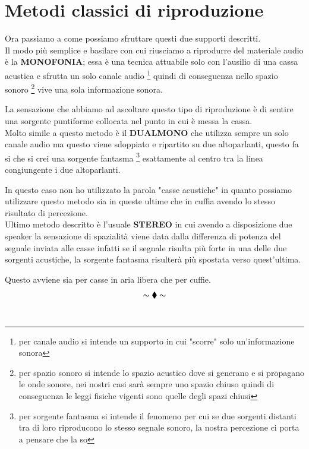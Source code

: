 \documentclass[12pt,a4paper]{report}
\begin{document}
\section{Metodi classici di riproduzione}\label{metodi}

Ora passiamo a come possiamo sfruttare questi due supporti descritti.\\

Il modo più semplice e basilare con cui riusciamo a riprodurre del materiale audio è la \textbf{MONOFONIA}; essa è una tecnica attuabile solo con l'ausilio di una cassa acustica e sfrutta un solo canale audio \footnote{per canale audio si intende un supporto in cui "scorre" solo un'informazione sonora}
quindi di conseguenza nello spazio sonoro \footnote{per spazio sonoro si intende lo spazio acustico dove si generano e si propagano le onde sonore, nei nostri casi sarà sempre uno spazio chiuso quindi di conseguenza le leggi fisiche vigenti sono quelle degli spazi chiusi} vive una sola informazione sonora.

La sensazione che abbiamo ad ascoltare questo tipo di riproduzione è di sentire una sorgente puntiforme collocata nel punto in cui è messa la cassa.\\

Molto simile a questo metodo è il \textbf{DUALMONO} che utilizza sempre un solo canale audio ma questo viene sdoppiato e ripartito su due altoparlanti, questo fa si che si crei una sorgente fantasma \footnote{per sorgente fantasma si intende il fenomeno per cui se due sorgenti distanti tra di loro riproducono lo stesso segnale sonoro, la nostra percezione ci porta a pensare che la so} esattamente al centro tra la linea congiungente i due altoparlanti. 

In questo caso non ho utilizzato la parola "casse acustiche" in quanto possiamo utilizzare questo metodo sia in queste ultime che in cuffia avendo lo stesso risultato di percezione.\\

Ultimo metodo descritto è l'usuale \textbf{STEREO} in cui avendo a disposizione due speaker la sensazione di spazialità viene data dalla differenza di potenza del segnale inviata alle casse infatti se il segnale risulta più forte in una delle due sorgenti acustiche, la sorgente fantasma risulterà più spostata verso quest'ultima.

Questo avviene sia per casse in aria libera che per cuffie. \\

\[ \thicksim \blacklozenge \thicksim \]\\
\end{document}
